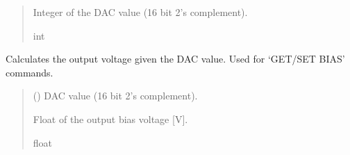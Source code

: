 \documentclass[letterpaper,10pt,english]{sphinxmanual}
\begin{document}
\begin{fulllineitems}
\begin{fulllineitems}
\begin{quote}
\begin{description}
\sphinxAtStartPar
Integer of the DAC value (16 bit 2’s complement).

\sphinxAtStartPar
int

\end{description}\end{quote}

\end{fulllineitems}


\begin{fulllineitems}
\label{\detokenize{PodApi.Devices:PodApi.Devices.PodDevice_8401HR.Pod8401HR.CalculateBiasDAC_GetVout}}
\pysigstartsignatures
{}
\pysigstopsignatures
\sphinxAtStartPar
Calculates the output voltage given the DAC value. Used for ‘GET/SET BIAS’ commands.
\begin{quote}\begin{description}
\sphinxAtStartPar
{} () \textendash{} DAC value (16 bit 2’s complement).

\sphinxAtStartPar
Float of the output bias voltage {[}V{]}.

\sphinxAtStartPar
float

\end{description}\end{quote}

\end{fulllineitems}



\end{fulllineitems}
\end{document}
